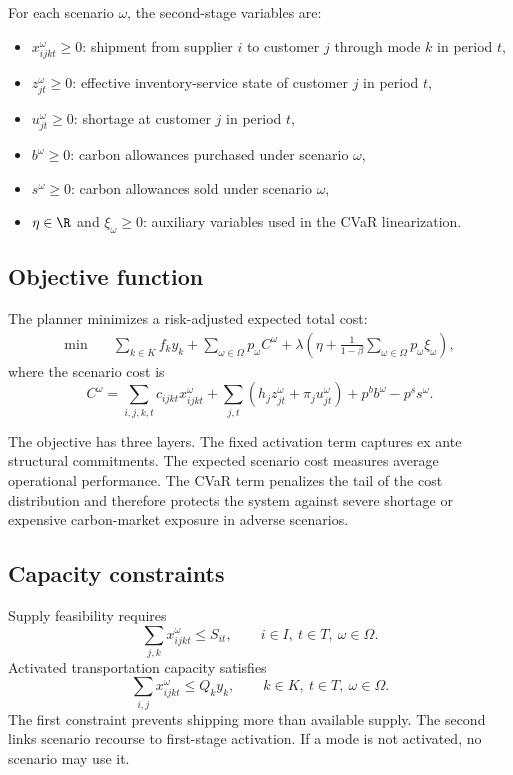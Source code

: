For each scenario $\omega$, the second-stage variables are:
\begin{itemize}[leftmargin=1.8em]
    \item $x_{ijkt}^{\omega}\ge 0$: shipment from supplier $i$ to customer $j$ through mode $k$ in period $t$,
    \item $z_{jt}^{\omega}\ge 0$: effective inventory-service state of customer $j$ in period $t$,
    \item $u_{jt}^{\omega}\ge 0$: shortage at customer $j$ in period $t$,
    \item $b^{\omega}\ge 0$: carbon allowances purchased under scenario $\omega$,
    \item $s^{\omega}\ge 0$: carbon allowances sold under scenario $\omega$,
    \item $\eta\in\R$ and $\xi_{\omega}\ge 0$: auxiliary variables used in the CVaR linearization.
\end{itemize}

\subsection{Objective function}
The planner minimizes a risk-adjusted expected total cost:
\begin{align}
\min \quad &\sum_{k\in K}f_k y_k
+\sum_{\omega\in\Omega}p_{\omega}C^{\omega}
+\lambda\left(\eta+\frac{1}{1-\beta}\sum_{\omega\in\Omega}p_{\omega}\xi_{\omega}\right),
\end{align}
where the scenario cost is
\begin{equation}
C^{\omega}=\sum_{i,j,k,t}c_{ijkt}x_{ijkt}^{\omega}
+\sum_{j,t}\left(h_j z_{jt}^{\omega}+\pi_j u_{jt}^{\omega}\right)
+p^b b^{\omega}-p^s s^{\omega}.
\end{equation}

The objective has three layers. The fixed activation term captures ex ante structural commitments. The expected scenario cost measures average operational performance. The CVaR term penalizes the tail of the cost distribution and therefore protects the system against severe shortage or expensive carbon-market exposure in adverse scenarios.

\subsection{Capacity constraints}
Supply feasibility requires
\begin{equation}
\sum_{j,k}x_{ijkt}^{\omega}\le S_{it},
\qquad i\in I,\ t\in T,\ \omega\in\Omega.
\end{equation}
Activated transportation capacity satisfies
\begin{equation}
\sum_{i,j}x_{ijkt}^{\omega}\le Q_k y_k,
\qquad k\in K,\ t\in T,\ \omega\in\Omega.
\end{equation}
The first constraint prevents shipping more than available supply. The second links scenario recourse to first-stage activation. If a mode is not activated, no scenario may use it.

